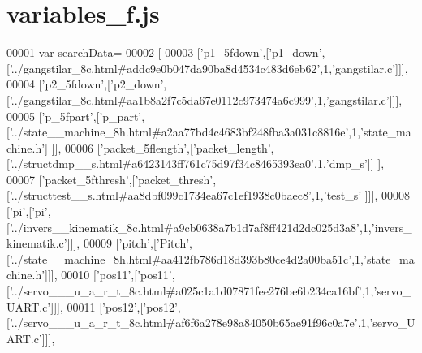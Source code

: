 \hypertarget{variables__f_8js_source}{}\section{variables\+\_\+f.\+js}
\label{variables__f_8js_source}

\begin{DoxyCode}
\hypertarget{variables__f_8js_source.tex_l00001}{}\hyperlink{variables__f_8js_ad01a7523f103d6242ef9b0451861231e}{00001} var \hyperlink{variables__f_8js_ad01a7523f103d6242ef9b0451861231e}{searchData}=
00002 [
00003   [\textcolor{stringliteral}{'p1\_5fdown'},[\textcolor{stringliteral}{'p1\_down'},[\textcolor{stringliteral}{'../gangstilar\_8c.html#addc9e0b047da90ba8d4534c483d6eb62'},1,\textcolor{stringliteral}{'gangstilar.c'}]]],
00004   [\textcolor{stringliteral}{'p2\_5fdown'},[\textcolor{stringliteral}{'p2\_down'},[\textcolor{stringliteral}{'../gangstilar\_8c.html#aa1b8a2f7c5da67e0112c973474a6c999'},1,\textcolor{stringliteral}{'gangstilar.c'}]]],
00005   [\textcolor{stringliteral}{'p\_5fpart'},[\textcolor{stringliteral}{'p\_part'},[\textcolor{stringliteral}{'../state\_\_machine\_8h.html#a2aa77bd4c4683bf248fba3a031c8816e'},1,\textcolor{stringliteral}{'state\_machine.h'}]
      ]],
00006   [\textcolor{stringliteral}{'packet\_5flength'},[\textcolor{stringliteral}{'packet\_length'},[\textcolor{stringliteral}{'../structdmp\_\_s.html#a6423143ff761c75d97f34c8465393ea0'},1,\textcolor{stringliteral}{'dmp\_s'}]]
      ],
00007   [\textcolor{stringliteral}{'packet\_5fthresh'},[\textcolor{stringliteral}{'packet\_thresh'},[\textcolor{stringliteral}{'../structtest\_\_s.html#aa8dbf099c1734ea67c1ef1938c0baec8'},1,\textcolor{stringliteral}{'test\_s'}
      ]]],
00008   [\textcolor{stringliteral}{'pi'},[\textcolor{stringliteral}{'pi'},[\textcolor{stringliteral}{'../invers\_\_kinematik\_8c.html#a9cb0638a7b1d7af8ff421d2dc025d3a8'},1,\textcolor{stringliteral}{'invers\_kinematik.c'}]]],
00009   [\textcolor{stringliteral}{'pitch'},[\textcolor{stringliteral}{'Pitch'},[\textcolor{stringliteral}{'../state\_\_machine\_8h.html#aa412fb786d18d393b80ce4d2a00ba51c'},1,\textcolor{stringliteral}{'state\_machine.h'}]]],
00010   [\textcolor{stringliteral}{'pos11'},[\textcolor{stringliteral}{'pos11'},[\textcolor{stringliteral}{'../servo\_\_\_u\_a\_r\_t\_8c.html#a025c1a1d07871fee276be6b234ca16bf'},1,\textcolor{stringliteral}{'servo\_UART.c'}]]],
00011   [\textcolor{stringliteral}{'pos12'},[\textcolor{stringliteral}{'pos12'},[\textcolor{stringliteral}{'../servo\_\_\_u\_a\_r\_t\_8c.html#af6f6a278e98a84050b65ae91f96c0a7e'},1,\textcolor{stringliteral}{'servo\_UART.c'}]]],

\end{DoxyCode}
